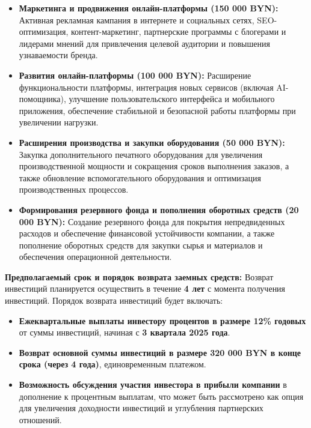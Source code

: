 \begin{itemize}
    \item \textbf{Маркетинга и продвижения онлайн-платформы (150 000 BYN):}  Активная рекламная кампания в интернете и социальных сетях, SEO-оптимизация, контент-маркетинг, партнерские программы с блогерами и лидерами мнений для привлечения целевой аудитории и повышения узнаваемости бренда.
    \item \textbf{Развития онлайн-платформы (100 000 BYN):}  Расширение функциональности платформы, интеграция новых сервисов (включая AI-помощника), улучшение пользовательского интерфейса и мобильного приложения, обеспечение стабильной и безопасной работы платформы при увеличении нагрузки.
    \item \textbf{Расширения производства и закупки оборудования (50 000 BYN):}  Закупка дополнительного печатного оборудования для увеличения производственной мощности и сокращения сроков выполнения заказов, а также обновление вспомогательного оборудования и оптимизация производственных процессов.
    \item \textbf{Формирования резервного фонда и пополнения оборотных средств (20 000 BYN):}  Создание резервного фонда для покрытия непредвиденных расходов и обеспечение финансовой устойчивости компании, а также пополнение оборотных средств для закупки сырья и материалов и обеспечения операционной деятельности.
\end{itemize}

\vspace{0.5cm}

\textbf{Предполагаемый срок и порядок возврата заемных средств:}  Возврат инвестиций планируется осуществить в течение \textbf{4 лет} с момента получения инвестиций.  Порядок возврата инвестиций будет включать:

\begin{itemize}
    \item \textbf{Ежеквартальные выплаты инвестору процентов в размере 12\% годовых} от суммы инвестиций, начиная с \textbf{3 квартала 2025 года}.
    \item \textbf{Возврат основной суммы инвестиций в размере 320 000 BYN в конце срока (через 4 года)}, единовременным платежом.
    \item \textbf{Возможность обсуждения участия инвестора в прибыли компании} в дополнение к процентным выплатам, что может быть рассмотрено как опция для увеличения доходности инвестиций и углубления партнерских отношений.
\end{itemize}

